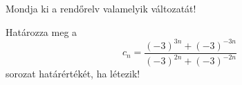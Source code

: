 \documentclass[11pt]{scrartcl}
\begin{document}
Mondja ki a rendőrelv valamelyik változatát!

Határozza meg a
\[
	c_n = \frac{(-3)^{3n} + (-3)^{-3n}}{(-3)^{2n} + (-3)^{-2n}}
\]
sorozat határértékét, ha létezik!
\end{document}
